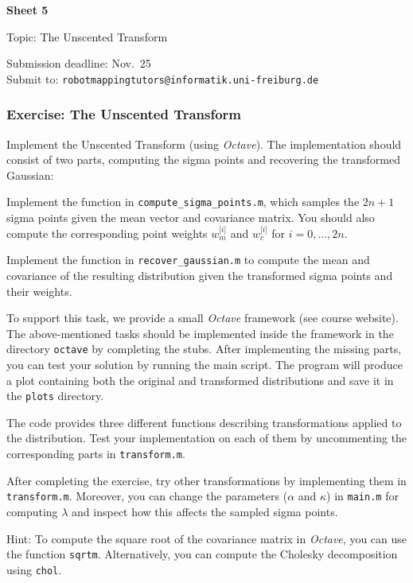\documentclass[12pt]{article}
\begin{document}


\begin{center}
{\bf \Large Sheet 5}

{\large Topic: The Unscented Transform}

Submission deadline: Nov.~25\\
Submit to: \texttt{robotmappingtutors@informatik.uni-freiburg.de}
\end{center}

\subsubsection*{Exercise: The Unscented Transform}

Implement the Unscented Transform (using \emph{Octave}). The
implementation should consist of two parts, computing the sigma
points and recovering the transformed Gaussian:

\begin{enumialpha}

\item Implement the function in \texttt{compute\_sigma\_points.m},
  which samples the $2n+1$ sigma points given the mean vector and
  covariance matrix. You should also compute the corresponding point
  weights $w_m^{\lbrack i \rbrack}$ and $w_c^{\lbrack i \rbrack}$ for
  $i= 0, \dots, 2n$.
    
\item Implement the function in \texttt{recover\_gaussian.m} to
  compute the mean and covariance of the resulting distribution given
  the transformed sigma points and their weights.
\end{enumialpha}

To support this task, we provide a small \emph{Octave} framework (see
course website).  The above-mentioned tasks should be implemented
inside the framework in the directory \texttt{octave} by completing
the stubs. After implementing the missing parts, you can test your
solution by running the main script. The program will produce a plot
containing both the original and transformed distributions and save it
in the \texttt{plots} directory.

The code provides three different functions describing transformations
applied to the distribution. Test your implementation on each of them
by uncommenting the corresponding parts in \texttt{transform.m}.

After completing the exercise, try other transformations by implementing
them in \texttt{transform.m}. Moreover, you can change the parameters 
($\alpha$ and $\kappa$) in \texttt{main.m} for computing $\lambda$ and 
inspect how this affects the sampled sigma points.

Hint: To compute the square root of the covariance matrix in
\emph{Octave}, you can use the function \texttt{sqrtm}. Alternatively,
you can compute the Cholesky decomposition using \texttt{chol}.
\end{document}
